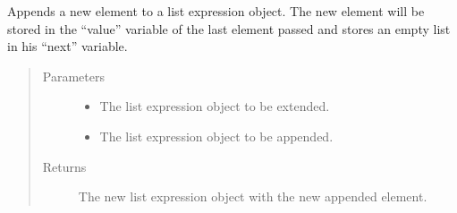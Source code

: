 \documentclass[letterpaper,10pt,english]{sphinxmanual}
\begin{document}
\begin{fulllineitems}
\label{\detokenize{index:secondodb.api.support.secondolistexpr.append_to_last_element}}
Appends a new element to a list expression object. The new element will be stored in the “value” variable of the
last element passed and stores an empty list in his “next” variable.
\begin{quote}\begin{description}
\item[{Parameters}] \leavevmode\begin{itemize}
\item {} 
 \textendash{} The list expression object to be extended.

\item {} 
 \textendash{} The list expression object to be appended.

\end{itemize}

\item[{Returns}] \leavevmode
The new list expression object with the new appended element.

\end{description}\end{quote}

\end{fulllineitems}

\end{document}
